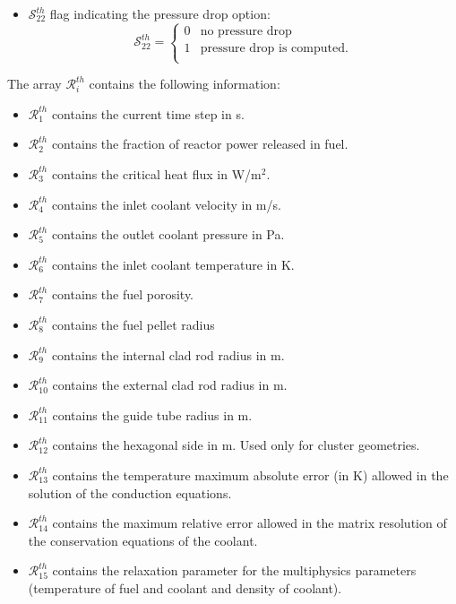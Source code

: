 \begin{itemize}
\item $\mathcal{S}^{th}_{22}$ flag indicating the pressure drop option:
\begin{displaymath} \mathcal{S}^{th}_{22} = \left\{
\begin{array}{rl}
 0 & \textrm{no pressure drop} \\
 1 & \textrm{pressure drop is computed.} \\
\end{array} \right.
\end{displaymath}

\end{itemize}

The array $\mathcal{R}^{th}_{i}$ contains the following information: 

\begin{itemize}
\item $\mathcal{R}^{th}_{1}$ contains the current time step in s. 
\item $\mathcal{R}^{th}_{2}$ contains the fraction of reactor power released in fuel.
\item $\mathcal{R}^{th}_{3}$ contains the critical heat flux in W/m$^2$.
\item $\mathcal{R}^{th}_{4}$ contains the inlet coolant velocity in m/s.
\item $\mathcal{R}^{th}_{5}$ contains the outlet coolant pressure in Pa.
\item $\mathcal{R}^{th}_{6}$ contains the inlet coolant temperature in K.
\item $\mathcal{R}^{th}_{7}$ contains the fuel porosity.
\item $\mathcal{R}^{th}_{8}$ contains the fuel pellet radius
\item $\mathcal{R}^{th}_{9}$ contains the internal clad rod radius in m.
\item $\mathcal{R}^{th}_{10}$ contains the external clad rod radius in m.
\item $\mathcal{R}^{th}_{11}$ contains the guide tube radius in m.
\item $\mathcal{R}^{th}_{12}$ contains the hexagonal side in m. Used only for cluster geometries.
\item $\mathcal{R}^{th}_{13}$ contains the temperature maximum absolute error (in K) allowed in the solution of the conduction equations.
\item $\mathcal{R}^{th}_{14}$ contains the maximum relative error allowed in the matrix resolution of the conservation equations of the coolant.
\item $\mathcal{R}^{th}_{15}$ contains the relaxation parameter for the multiphysics parameters (temperature of fuel and coolant  and density of coolant).

\end{itemize}
